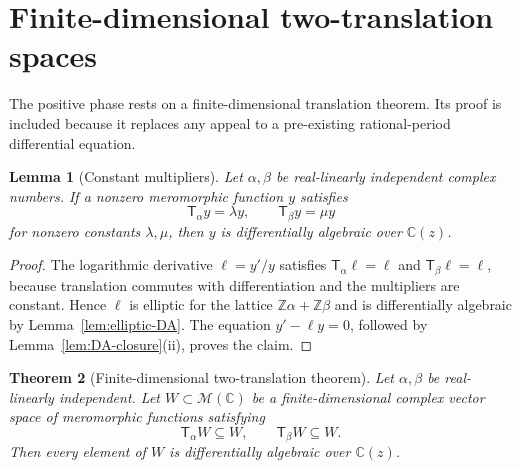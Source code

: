 \documentclass[11pt]{article}
\numberwithin{equation}{section}
\newtheorem{theorem}{Theorem}[section]
\newtheorem{lemma}[theorem]{Lemma}
\theoremstyle{definition}
\theoremstyle{remark}
\newcommand{\C}{\mathbb C}
\newcommand{\Z}{\mathbb Z}
\newcommand{\M}{\mathcal M}
\newcommand{\T}{\mathsf T}
\begin{document}
\section{Finite-dimensional two-translation spaces}
\label{sec:stable}

The positive phase rests on a finite-dimensional translation theorem.  Its
proof is included because it replaces any appeal to a pre-existing
rational-period differential equation.

\begin{lemma}[Constant multipliers]
\label{lem:constant-multipliers}
Let $\alpha,\beta$ be real-linearly independent complex numbers.  If a
nonzero meromorphic function $y$ satisfies
\[
 \T_\alpha y=\lambda y,
 \qquad \T_\beta y=\mu y
\]
for nonzero constants $\lambda,\mu$, then $y$ is differentially algebraic
over $\C(z)$.
\end{lemma}

\begin{proof}
The logarithmic derivative $\ell=y'/y$ satisfies
$\T_\alpha\ell=\ell$ and $\T_\beta\ell=\ell$, because translation commutes
with differentiation and the multipliers are constant.  Hence $\ell$ is
elliptic for the lattice $\Z\alpha+\Z\beta$ and is differentially algebraic
by Lemma~\ref{lem:elliptic-DA}.  The equation $y'-\ell y=0$, followed by
Lemma~\ref{lem:DA-closure}(ii), proves the claim.
\end{proof}

\begin{theorem}[Finite-dimensional two-translation theorem]
\label{thm:stable-space}
Let $\alpha,\beta$ be real-linearly independent.  Let $W\subset\M(\C)$ be a
finite-dimensional complex vector space of meromorphic functions satisfying
\[
 \T_\alpha W\subseteq W,
 \qquad \T_\beta W\subseteq W.
\]
Then every element of $W$ is differentially algebraic over $\C(z)$.
\end{theorem}
\end{document}
